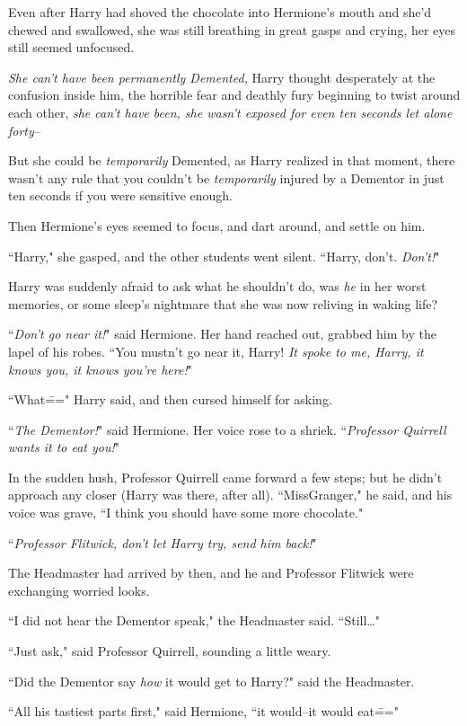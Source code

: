 Even after Harry had shoved the chocolate into Hermione's mouth and she'd chewed and swallowed, she was still breathing in great gasps and crying, her eyes still seemed unfocused.

\emph{She can't have been permanently Demented,} Harry thought desperately at the confusion inside him, the horrible fear and deathly fury beginning to twist around each other, \emph{she can't have been, she wasn't exposed for even ten seconds let alone forty\---}

But she could be \emph{temporarily} Demented, as Harry realized in that moment, there wasn't any rule that you couldn't be \emph{temporarily} injured by a Dementor in just ten seconds if you were sensitive enough.

Then Hermione's eyes seemed to focus, and dart around, and settle on him.

``Harry," she gasped, and the other students went silent. ``Harry, don't. \emph{Don't!}"

Harry was suddenly afraid to ask what he shouldn't do, was \emph{he} in her worst memories, or some sleep's nightmare that she was now reliving in waking life?

``\emph{Don't go near it!}" said Hermione. Her hand reached out, grabbed him by the lapel of his robes. ``You mustn't go near it, Harry! \emph{It spoke to me, Harry, it knows you, it knows you're here!}"

``What\===" Harry said, and then cursed himself for asking.

``\emph{The Dementor!}" said Hermione. Her voice rose to a shriek. ``\emph{Professor Quirrell wants it to eat you!}"

In the sudden hush, Professor Quirrell came forward a few steps; but he didn't approach any closer (Harry was there, after all). ``Miss\?Granger," he said, and his voice was grave, ``I think you should have some more chocolate."

``\emph{Professor Flitwick, don't let Harry try, send him back!}"

The Headmaster had arrived by then, and he and Professor Flitwick were exchanging worried looks.

``I did not hear the Dementor speak," the Headmaster said. ``Still{\ldots}"

``Just ask," said Professor Quirrell, sounding a little weary.

``Did the Dementor say \emph{how} it would get to Harry?" said the Headmaster.

``All his tastiest parts first," said Hermione, ``it would\---it would eat\==="

